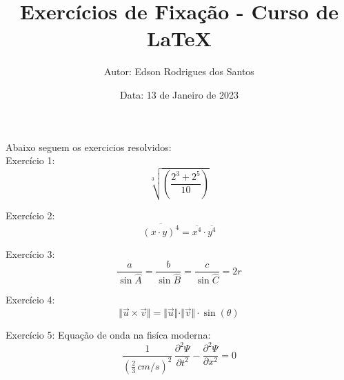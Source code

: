 \documentclass[a4paper,12pt]{article}
\title{\textbf{Exercícios de Fixação - Curso de LaTeX}}
\author{Autor: Edson Rodrigues dos Santos}
\date{Data: 13 de Janeiro de 2023}
\begin{document}
\maketitle

Abaixo seguem os exercicios resolvidos:\\


Exercício 1:
\begin{equation}
\sqrt[3]{\left(\frac{2^3 + 2^5}{10}\right) }
\end{equation}

Exercício 2:
\begin{equation}
\overline{(x \cdot y)^4} = \overline{x^4} \cdot \overline{y^4}
\end{equation}

Exercício 3:
\begin{equation}
\frac{a}{\sin{\widehat{A}}} = \frac{b}{\sin{\widehat{B}}} = \frac{c}{\sin{\widehat{C}}} = 2r
\end{equation}

Exercício 4:
\begin{equation}
\Vert\vec{u} \times \vec{v}\Vert = \Vert\vec{u}\Vert \cdot  \Vert\vec{v}\Vert \cdot \sin(\theta)
\end{equation}

Exercício 5:
Equação de onda na fisíca moderna:
\begin{equation}
\frac{1}{\left(\frac{2}{3}\,cm/s\right)^{2}}\, \frac{\partial^{2}\Psi}{\partial t^{2}} - \frac{\partial^{2}\Psi}{\partial x^{2}} = 0
\end{equation}
\end{document}
